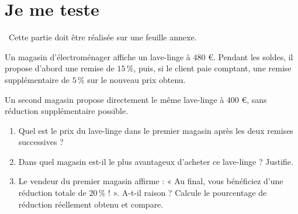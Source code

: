 \documentclass[../../syllabus_1.tex]{subfiles}
\begin{document}
\newpage
\section{Je me teste}
~Cette partie doit être réalisée sur une feuille annexe.
\setcounter{exercise}{0}

\begin{exercise}
    Un magasin d'électroménager affiche un lave-linge à $480$ €. Pendant les soldes, il propose d'abord une remise de $15\,\%$, puis, si le client paie comptant, une remise supplémentaire de $5\,\%$ sur le nouveau prix obtenu.

    Un second magasin propose directement le même lave-linge à $400$ €, sans réduction supplémentaire possible.
    \begin{enumerate}
        \item Quel est le prix du lave-linge dans le premier magasin après les deux remises successives ?
        \item Dans quel magasin est-il le plus avantageux d'acheter ce lave-linge ? Justifie.
        \item Le vendeur du premier magasin affirme : « Au final, vous bénéficiez d'une réduction totale de $20\,\%$ ! ». A-t-il raison ? Calcule le pourcentage de réduction réellement obtenu et compare.
    \end{enumerate}
\end{exercise}
\end{document}
